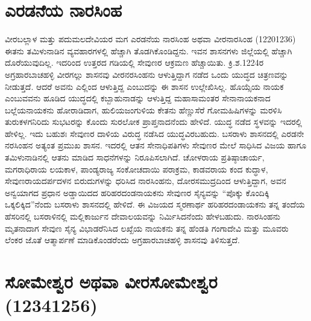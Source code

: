 \section{ಎರಡನೆಯ ನಾರಸಿಂಹ}

ವೀರಬಲ್ಲಾಳ ಮತ್ತು ಪದುಮಲದೇವಿಯರ ಮಗ ಎರಡನೆಯ ನಾರಸಿಂಹ ಅಥವಾ ವೀರನಾರಸಿಂಹ (12201236) ಈತನು ತಮಿಳುನಾಡಿನ ವ್ಯವಹಾರಗಳಲ್ಲಿ ಹೆಚ್ಚಾಗಿ ತೊಡಗಿಕೊಂಡಿದ್ದನು. ಇವನ ಶಾಸನಗಳು ಜಿಲ್ಲೆಯಲ್ಲಿ ಹೆಚ್ಚಾಗಿ ದೊರೆಯುವುದಿಲ್ಲ. ಇದರಿಂದ ಉತ್ತರದ ಗಡಿಯಲ್ಲಿ ಸೇವುಣರ ಆಕ್ರಮಣ ಹೆಚ್ಚಾಯಿತು. ಕ್ರಿ.ಶ.1224ರ ಅಗ್ರಹಾರಬಾಚಹಳ್ಳಿ ವೀರಗಲ್ಲು ಶಾಸನವು ವೀರನರಸಿಂಹನು ಆಳುತ್ತಿದ್ದಾಗ ನಡೆದ ಒಂದು ಯುದ್ಧದ ಚಿತ್ರಣವನ್ನು ನೀಡುತ್ತದೆ. ಆದರೆ ಅವನು ಎಲ್ಲಿಂದ ಆಳುತ್ತಿದ್ದ ಎಂಬುದನ್ನು ಈ ಶಾಸನ ಉಲ್ಲೇಖಿಸಿಲ್ಲ. ಹೊಯ್ಸೆಯ ನಾಯಕ ಎಂಬುವವನು ಹೂಡಿದ ಯುದ್ಧದಲ್ಲಿ ಕಬ್ಬಾಹುನಾಡನ್ನು ಆಳುತ್ತಿದ್ದ ಮಹಾಸಾಮಂತರ ಸೇನಾನಾಯಕನಾದ ಬಲ್ಲೆಯನಾಯಕನು ಹೋರಾಡಿದಾಗ, ಹುಲಿಯಜಂಗುಳಿಯ ಕೇತನು ಹೆಣ್ಣುಸೆರೆ ಗೋಮಹಿಷಿಗಳನ್ನು ಮರಳಿಸಿ ತುರುಕಳಗನಿರಿದು ಸುಭಟರನ್ನು ಕೊಂದು ಸುರಲೋಕ ಪ್ರಾಪ್ತನಾದನೆಂದು ಹೇಳಿದೆ. ಯುದ್ಧ ನಡೆದ ಸ್ಥಳವನ್ನು ಇದರಲ್ಲಿ ಹೇಳಿಲ್ಲ. ಇದು ಬಹುಶಃ ಸೇವುಣರ ದಾಳಿಯ ವಿರುದ್ಧ ನಡೆಸಿದ ಯುದ್ಧವಿರಬಹುದು. ಬಸರಾಳು ಶಾಸನದಲ್ಲಿ ಎರಡನೇ ನರಸಿಂಹನ ಅತ್ಯಂತ ಪ್ರಮುಖ ಶಾಸನ. ಇದರಲ್ಲಿ ಆತನ ಸೇನಾಧಿಪತಿಗಳು ಸೇವುಣರ ಮೇಲೆ ಸಾಧಿಸಿದ ವಿಜಯ ಹಾಗೂ ತಮಿಳುನಾಡಿನಲ್ಲಿ ಆತನು ಮಾಡಿದ ಸಾಧನೆಗಳನ್ನು ನಿರೂಪಿಸಲಾಗಿದೆ. ಚೋಳರಾಯ ಪ್ರತಿಷ್ಠಾಚಾರ್ಯ, ಮಗರಾಧಿರಾಯ ಲಯಕಾಳ, ಪಾಂಡ್ಯರಾಜ್ಯ ಸಂಕೋಚದಾಯಿ ಪರಾಕ್ರಮ, ಕಾಡವರಾಯ ಕಂದ ಕುದ್ಧಾಳ, ಸೇವುಣರಾಯದರ್ಪದಳನ ಬಿರುದುಗಳನ್ನು ಧರಿಸಿದ ನಾರಸಿಂಹನು, ದೋರಸಮುದ್ರದಿಂದ ಆಳುತ್ತಿದ್ದಾಗ, ಅವನ ಅನ್ವಯಾಗದ ಪ್ರಧಾನ ಅಡ್ಡಾಯಿದದ ಹರಿಹರದಂಡನಾಯಕನು ಸೇವುಣರ ಸೈನ್ಯವನ್ನು “ಪೊಕ್ಕು ಕೊಂದಿಕ್ಕಿ ಒಕ್ಕಲಿಕ್ಕಿದ”ನೆಂದು ಬಸರಾಳು ಶಾಸನದಲ್ಲಿ ಹೇಳಿದೆ. ಈ ವಿಜಯದ ಸ್ಮರಣಾರ್ಥ ಹರಿಹರದಂಡಾಯಕನು ತನ್ನ ತಂದೆಯ ಹೆಸರಿನಲ್ಲಿ ಬಸರಾಳಿನಲ್ಲಿ ಮಲ್ಲಿಕಾರ್ಜುನ ದೇವಾಲಯವನ್ನು ನಿರ್ಮಿಸಿದನೆಂದು ಹೇಳಬಹುದು. ನಾರಸಿಂಹನು ಮೃತನಾದಾಗ ಸೇವುಣ ಸೈನ್ಯ ವಿಭಾಡರೆನಿಸಿದ ಲಖ್ಖೆಯ ನಾಯಕನು ತನ್ನ ಹೆಂಡತಿ ಗಂಗಾದೇವಿ ಮತ್ತು ಮೂವರು ಲೆಂಕರ ಜೊತೆ ಆತ್ಮಾರ್ಪಣೆ ಮಾಡಿಕೊಂಡರೆಂದು ಅಗ್ರಹಾರಬಾಚಹಳ್ಳಿ ಶಾಸನವು ತಿಳಿಸುತ್ತದೆ.


\section{ಸೋಮೇಶ್ವರ ಅಥವಾ ವೀರಸೋಮೇಶ್ವರ (12341256)}


